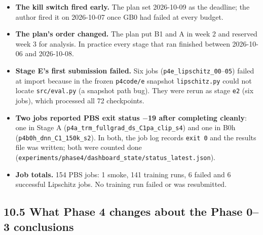 \documentclass[11pt]{article}
\begin{document}
\begin{itemize}
\item \textbf{The kill switch fired early.} The plan set 2026-10-09 as the deadline; the author fired it on 2026-10-07 once GB0 had failed at every budget.
\item \textbf{The plan's order changed.} The plan put B1 and A in week 2 and reserved week 3 for analysis. In practice every stage that ran finished between 2026-10-06 and 2026-10-08.
\item \textbf{Stage E's first submission failed.} Six jobs (\texttt{p4e\_\allowbreak{}lipschitz\_\allowbreak{}00}--\texttt{05}) failed at import because in the frozen \texttt{p4code/e} snapshot \texttt{lipschitz.py} could not locate \texttt{src/eval.py} (a snapshot path bug). They were rerun as stage \texttt{e2} (six jobs), which processed all 72 checkpoints.
\item \textbf{Two jobs reported PBS exit status $-$19 after completing cleanly}: one in Stage A (\texttt{p4a\_\allowbreak{}trm\_\allowbreak{}fullgrad\_\allowbreak{}ds\_\allowbreak{}C1pa\_\allowbreak{}clip\_\allowbreak{}s4}) and one in B0h (\texttt{p4b0h\_\allowbreak{}dnn\_\allowbreak{}C1\_\allowbreak{}150k\_\allowbreak{}s2}). In both, the job log records \texttt{exit 0} and the results file was written; both were counted done (\texttt{experiments/\allowbreak{}phase4/\allowbreak{}dashboard\_\allowbreak{}state/\allowbreak{}status\_\allowbreak{}latest.\allowbreak{}json}).
\item \textbf{Job totals.} 154 PBS jobs: 1 smoke, 141 training runs, 6 failed and 6 successful Lipschitz jobs. No training run failed or was resubmitted.
\end{itemize}





\subsection*{10.5 What Phase 4 changes about the Phase 0--3 conclusions}
\end{document}
